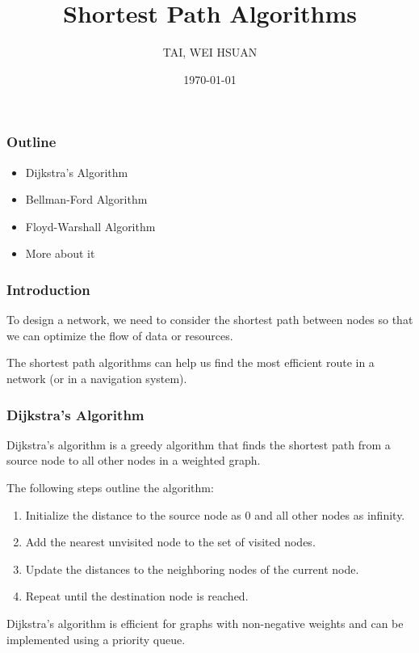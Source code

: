 \documentclass[xcolor=dvipsnames]{beamer}
\title{Shortest Path Algorithms}
\author{TAI, WEI HSUAN}
\date{\today}
\begin{document}
	
	\begin{frame}
		\titlepage
	\end{frame}
	
	\begin{frame}
		\frametitle{Outline}
        \begin{itemize}
            \item Dijkstra's Algorithm
            \item Bellman-Ford Algorithm
            \item Floyd-Warshall Algorithm
            \item More about it
        \end{itemize}
	\end{frame}
	
	\begin{frame}
        \frametitle{Introduction}
		To design a network, we need to consider the shortest path between nodes 
        so that we can optimize the flow of data or resources.

        The shortest path algorithms can help us find the most efficient route in a network (or in a navigation system).
	\end{frame}

    \begin{frame}
        \frametitle{Dijkstra's Algorithm}
        Dijkstra's algorithm is a greedy algorithm that finds the shortest path 
        from a source node to all other nodes in a weighted graph.

        The following steps outline the algorithm:
        \begin{enumerate}
            \item Initialize the distance to the source node as 0 and all other nodes as infinity.
            \item Add the nearest unvisited node to the set of visited nodes.
            \item Update the distances to the neighboring nodes of the current node.
            \item Repeat until the destination node is reached.
        \end{enumerate}
        \vspace{0.5cm}
        Dijkstra's algorithm is efficient for graphs with non-negative weights and can be implemented using a priority queue.
    \end{frame}
\end{document}
